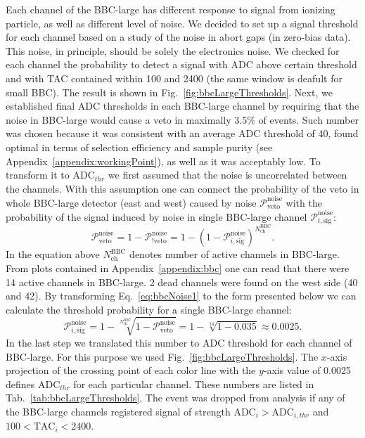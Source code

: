 Each channel of the BBC-large has different response to signal from ionizing particle, as well as different level of noise. We decided to set up a signal threshold for each channel based on a study of the noise in abort gaps (in zero-bias data). This noise, in principle, should be solely the electronics noise. We checked for each channel the probability to detect a signal with ADC above certain threshold and with TAC contained within 100 and 2400 (the same window is deafult for small BBC). The result is shown in Fig.~\ref{fig:bbcLargeThresholds}. Next, we established final ADC thresholds in each BBC-large channel by requiring that the noise in BBC-large would cause a veto in maximally $3.5\%$ of events. Such number was chosen because it was consistent with an average ADC threshold of 40, found optimal in terms of selection efficiency and sample purity (see Appendix~\ref{appendix:workingPoint}), as well as it was acceptably low. To transform it to $\text{ADC}_{thr}$ we first assumed that the noise is uncorrelated between the channels. With this assumption one can connect the probability of the veto in whole BBC-large detector (east and west) caused by noise $\mathcal{P}_{\text{veto}}^{\text{noise}}$ with the probability of the signal induced by noise in single BBC-large channel $\mathcal{P}_{i,\text{sig}}^{\text{noise}}$:
\begin{equation}\label{eq:bbcNoise1}
 \mathcal{P}_{\text{veto}}^{\text{noise}} = 1-\mathcal{P}_{!\text{veto}}^{\text{noise}} = 1-\left( 1-\mathcal{P}_{i,\text{sig}}^{\text{noise}} \right)^{N^{\text{BBC}}_{\text{ch}}}.
\end{equation}
In the equation above $N^{\text{BBC}}_{\text{ch}}$ denotes number of active channels in BBC-large. From plots contained in Appendix~\ref{appendix:bbc} one can read that there were 14 active channels in BBC-large. 2 dead channels were found on the west side (40 and 42). By transforming Eq.~\ref{eq:bbcNoise1} to the form presented below we can calculate the threshold probability for a single BBC-large channel:
\begin{equation}\label{eq:bbcNoise2}
 \mathcal{P}_{i,\text{sig}}^{\text{noise}} = 1-\sqrt[N^{\text{BBC}}_{\text{ch}}]{1-\mathcal{P}_{\text{veto}}^{\text{noise}}} = 1-\sqrt[14]{1-0.035} \approx 0.0025.
\end{equation}
In the last step we translated this number to ADC threshold for each channel of BBC-large. For this purpose we used Fig.~\ref{fig:bbcLargeThresholds}. The $x$-axis projection of the crossing point of each color line with the $y$-axis value of 0.0025 defines $\text{ADC}_{thr}$ for each particular channel. These numbers are listed in Tab.~\ref{tab:bbcLargeThresholds}. The event was dropped from analysis if any of the BBC-large channels registered signal of strength $\text{ADC}_{i}>\text{ADC}_{i,thr}$ and $100<\text{TAC}_{i}<2400$.



